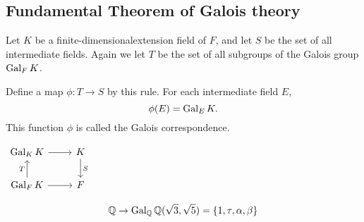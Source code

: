 \subsection{Fundamental Theorem of Galois theory}

\begin{definition}
    Let $K$ be a finite-dimensionalextension field of $F$, and let 
    $S$ be the set of all intermediate fields. Again we let 
    $T$ be the set of all subgroups of the Galois group $\operatorname{Gal}_F K$.

    Define a map $\phi : T \to S$ by this rule. For each intermediate field $E$,
    \begin{equation}
        \phi(E) = \operatorname{Gal}_E K.
    \end{equation} 
    This function $\phi$ is called the Galois correspondence.

    \begin{center}
        $\begin{tikzcd}
            \gal_K K \arrow[r] 
            & K \arrow[d, "S"] \\
            \gal_F K \arrow[u,"T"] \arrow[r]
            & F
            \end{tikzcd}
        $
    \end{center}
\end{definition}

\begin{example}
    \[
        \mathbb{Q} \rightarrow \operatorname{Gal}_\mathbb{Q} \mathbb{Q}(\sqrt{3}, \sqrt{5}) = \{1, \tau, \alpha, \beta \}
    \]
\end{example}

